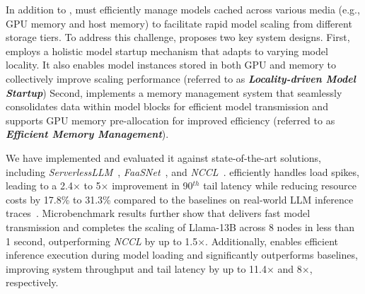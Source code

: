 \fi

In addition to \AlgoName, \SysName must efficiently manage models cached across various media (e.g., GPU memory and host memory) to facilitate rapid model scaling from different storage tiers.
To address this challenge, \SysName proposes two key system designs.
First, \SysName employs a holistic model startup mechanism that adapts to varying model locality. It also enables model instances stored in both GPU and memory to collectively improve scaling performance (referred to as \textbf{\emph{Locality-driven Model Startup}})
Second, \SysName implements a memory management system that seamlessly consolidates data within model blocks for efficient model transmission and supports GPU memory pre-allocation for improved efficiency (referred to as \textbf{\emph{Efficient Memory Management}}). 

We have implemented \SysName and evaluated it against state-of-the-art solutions, including \textit{ServerlessLLM}~\cite{fu_serverlessllm_2024}, \textit{FaaSNet}~\cite{wang_faasnet_nodate}, and \textit{NCCL}~\cite{nccl}.  
\SysName efficiently handles load spikes, leading to a 2.4$\times$ to 5$\times$ improvement in 90$^{th}$ tail latency while reducing resource costs by 17.8\% to 31.3\% compared to the baselines on real-world LLM inference traces~\cite{burstGPT_arxiv24}.  
Microbenchmark results further show that \SysName delivers fast model transmission and completes the scaling of Llama-13B across 8 nodes in less than 1 second, outperforming \textit{NCCL} by up to 1.5$\times$. 
Additionally, \SysName enables efficient inference execution during model loading and significantly outperforms baselines, improving system throughput and tail latency by up to 11.4$\times$ and 8$\times$, respectively.
\fi 

